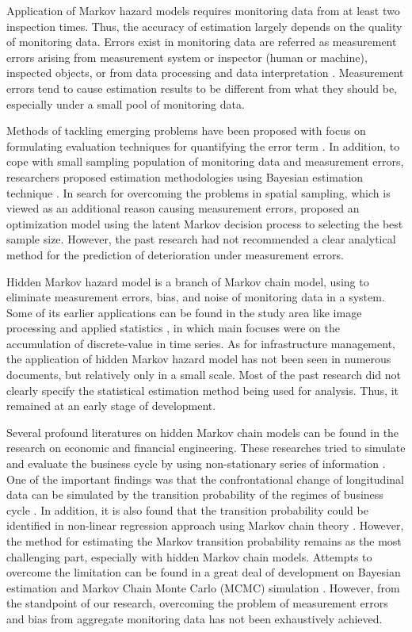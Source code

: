 Application of Markov hazard models requires monitoring data from at least two inspection times. Thus, the accuracy of estimation largely depends on the quality of monitoring data. Errors exist in monitoring data are referred as measurement errors arising from measurement system or inspector (human or machine), inspected objects, or from data processing and data interpretation \citep{humplick}. Measurement errors tend to cause estimation results to be different from what they should be, especially under a small pool of monitoring data.

Methods of tackling emerging problems have been proposed with focus on formulating evaluation techniques for quantifying the error term  \citep{cochran,grubbs,humplick}. In addition, to cope with small sampling population of monitoring data and measurement errors, researchers proposed estimation methodologies using Bayesian estimation technique \citep{fenghong,ben-akiva93,ben-akiva95}. In search for overcoming the problems in spatial sampling, which is viewed as an additional reason causing measurement errors, \citet{mishalanigong} proposed an optimization model using the latent Markov decision process to selecting the best sample size. However, the past research had not recommended a clear analytical method for the prediction of deterioration under measurement errors.

Hidden Markov hazard model is a branch of Markov chain model, using to eliminate measurement errors, bias, and noise of monitoring data in a system. Some of its earlier applications can be found in the study area like image processing and applied statistics \citep{robe,mac}, in which main focuses were on the accumulation of discrete-value in time series. As for infrastructure management, the application of hidden Markov hazard model has not been seen in numerous documents, but relatively only in a small scale. Most of the past research did not clearly specify the statistical estimation method being used for analysis. Thus, it remained at an early stage of development.

Several profound literatures on hidden Markov chain models can be found in the research on economic and financial engineering. These researches tried to simulate and evaluate the business cycle by using non-stationary series of information \citep{hami89}. One of the important findings was that the confrontational change of longitudinal data can be simulated by the transition probability of the regimes of business cycle \citep{Die-Ino}. In addition, it is also found that the transition probability could be identified in non-linear regression approach using Markov chain theory  \citep{hami89,kim-nel}. However, the method for estimating the Markov transition probability remains as the most challenging part, especially with hidden Markov chain models. Attempts to overcome the limitation can be found in a great deal of development on Bayesian estimation and Markov Chain Monte Carlo (MCMC) simulation \citep{wago}.  However, from the standpoint of our research, overcoming the problem of measurement errors and bias from aggregate monitoring data has not been exhaustively achieved. 


